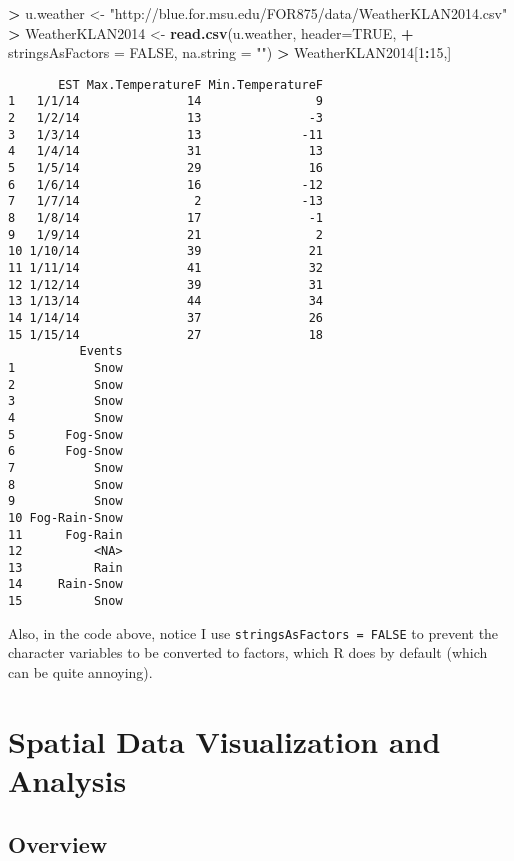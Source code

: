 \documentclass[]{krantz}
\makeatletter
\newenvironment{Shaded}{\begin{snugshade}}{\end{snugshade}}
\newcommand{\KeywordTok}[1]{\textcolor[rgb]{0.27,0.27,0.27}{\textbf{#1}}}
\newcommand{\DataTypeTok}[1]{\textcolor[rgb]{0.27,0.27,0.27}{#1}}
\newcommand{\DecValTok}[1]{\textcolor[rgb]{0.06,0.06,0.06}{#1}}
\newcommand{\StringTok}[1]{\textcolor[rgb]{0.5,0.5,0.5}{#1}}
\newcommand{\OtherTok}[1]{\textcolor[rgb]{0.37,0.37,0.37}{#1}}
\newcommand{\OperatorTok}[1]{\textcolor[rgb]{0.43,0.43,0.43}{\textbf{#1}}}
\newcommand{\NormalTok}[1]{#1}
\newenvironment{kframe}{%
\medskip{}
\setlength{\fboxsep}{.8em}
 \def\at@end@of@kframe{}%
 \ifinner\ifhmode%
  \def\at@end@of@kframe{\end{minipage}}%
  \begin{minipage}{\columnwidth}%
 \fi\fi%
 \def\FrameCommand##1{\hskip\@totalleftmargin \hskip-\fboxsep
 \colorbox{shadecolor}{##1}\hskip-\fboxsep
     \hskip-\linewidth \hskip-\@totalleftmargin \hskip\columnwidth}%
 \MakeFramed {\advance\hsize-\width
   \@totalleftmargin\z@ \linewidth\hsize
   \@setminipage}}%
 {\par\unskip\endMakeFramed%
 \at@end@of@kframe}
\renewenvironment{Shaded}{\begin{kframe}}{\end{kframe}}
\theoremstyle{definition}
\theoremstyle{definition}
\theoremstyle{definition}
\theoremstyle{remark}
\makeatother
\begin{document}
\begin{Shaded}
\begin{Highlighting}[]
\OperatorTok{>}\StringTok{ }\NormalTok{u.weather <-}\StringTok{ "http://blue.for.msu.edu/FOR875/data/WeatherKLAN2014.csv"}
\OperatorTok{>}\StringTok{ }\NormalTok{WeatherKLAN2014 <-}\StringTok{ }\KeywordTok{read.csv}\NormalTok{(u.weather, }\DataTypeTok{header=}\OtherTok{TRUE}\NormalTok{, }
\OperatorTok{+}\StringTok{                             }\DataTypeTok{stringsAsFactors =} \OtherTok{FALSE}\NormalTok{, }\DataTypeTok{na.string =} \StringTok{""}\NormalTok{)}
\OperatorTok{>}\StringTok{ }\NormalTok{WeatherKLAN2014[}\DecValTok{1}\OperatorTok{:}\DecValTok{15}\NormalTok{,]}
\end{Highlighting}
\end{Shaded}

\begin{verbatim}
       EST Max.TemperatureF Min.TemperatureF
1   1/1/14               14                9
2   1/2/14               13               -3
3   1/3/14               13              -11
4   1/4/14               31               13
5   1/5/14               29               16
6   1/6/14               16              -12
7   1/7/14                2              -13
8   1/8/14               17               -1
9   1/9/14               21                2
10 1/10/14               39               21
11 1/11/14               41               32
12 1/12/14               39               31
13 1/13/14               44               34
14 1/14/14               37               26
15 1/15/14               27               18
          Events
1           Snow
2           Snow
3           Snow
4           Snow
5       Fog-Snow
6       Fog-Snow
7           Snow
8           Snow
9           Snow
10 Fog-Rain-Snow
11      Fog-Rain
12          <NA>
13          Rain
14     Rain-Snow
15          Snow
\end{verbatim}

Also, in the code above, notice I use
\texttt{stringsAsFactors\ =\ FALSE} to prevent the character variables
to be converted to factors, which R does by default (which can be quite
annoying).

\chapter{Spatial Data Visualization and
Analysis}\label{spatial-data-visualization-and-analysis}

\section{Overview}\label{overview}
\end{document}
